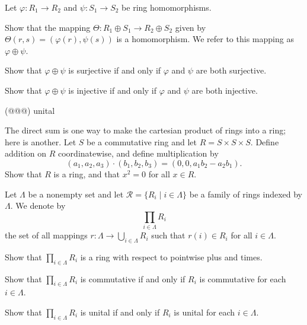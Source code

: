 \begin{exercise}
Let \(\varphi : R_1 \rightarrow R_2\) and \(\psi : S_1 \rightarrow S_2\) be ring homomorphisms.
\begin{proplist}
\item Show that the mapping \(\Theta : R_1 \oplus S_1 \rightarrow R_2 \oplus S_2\) given by \(\Theta(r,s) = (\varphi(r), \psi(s))\) is a homomorphism.
We refer to this mapping as \(\varphi \oplus \psi\).
\item Show that \(\varphi \oplus \psi\) is surjective if and only if \(\varphi\) and \(\psi\) are both surjective.
\item Show that \(\varphi \oplus \psi\) is injective if and only if \(\varphi\) and \(\psi\) are both injective.
\item (@@@) unital
\end{proplist}
\end{exercise}


\begin{exercise}
The direct sum is one way to make the cartesian product of rings into a ring; here is another.
Let \(S\) be a commutative ring and let \(R = S \times S \times S\).
Define addition on \(R\) coordinatewise, and define multiplication by \[ (a_1,a_2,a_3) \cdot (b_1,b_2,b_3) = (0,0,a_1b_2 - a_2b_1). \]
Show that \(R\) is a ring, and that \(x^2 = 0\) for all \(x \in R\).
\end{exercise}


\begin{exercise} \label{exerc:direct-product}
Let \(\Lambda\) be a nonempty set and let \(\mathcal{R} = \{ R_i \mid i \in \Lambda \}\) be a family of rings indexed by \(\Lambda\).
We denote by \[ \prod_{i \in \Lambda} R_i \] the set of all mappings \(r : \Lambda \rightarrow \bigcup_{i \in \Lambda} R_i\) such that \(r(i) \in R_i\) for all \(i \in \Lambda\).
\begin{proplist}
\item Show that \(\prod_{i \in \Lambda} R_i\) is a ring with respect to pointwise plus and times.
\item Show that \(\prod_{i \in \Lambda} R_i\) is commutative if and only if \(R_i\) is commutative for each \(i \in \Lambda\).
\item Show that \(\prod_{i \in \Lambda} R_i\) is unital if and only if \(R_i\) is unital for each \(i \in \Lambda\).
\end{proplist}
\end{exercise}


